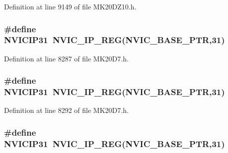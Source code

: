 Definition at line 9149 of file M\+K20\+D\+Z10.\+h.

\subsubsection[{\texorpdfstring{N\+V\+I\+C\+I\+P31}{NVICIP31}}]{\setlength{\rightskip}{0pt plus 5cm}\#define N\+V\+I\+C\+I\+P31~{\bf N\+V\+I\+C\+\_\+\+I\+P\+\_\+\+R\+EG}({\bf N\+V\+I\+C\+\_\+\+B\+A\+S\+E\+\_\+\+P\+TR},31)}\hypertarget{group___n_v_i_c___register___accessor___macros_ga967eba1d57cc2840334d1ee19cf97795}{}\label{group___n_v_i_c___register___accessor___macros_ga967eba1d57cc2840334d1ee19cf97795}


Definition at line 8287 of file M\+K20\+D7.\+h.

\subsubsection[{\texorpdfstring{N\+V\+I\+C\+I\+P31}{NVICIP31}}]{\setlength{\rightskip}{0pt plus 5cm}\#define N\+V\+I\+C\+I\+P31~{\bf N\+V\+I\+C\+\_\+\+I\+P\+\_\+\+R\+EG}({\bf N\+V\+I\+C\+\_\+\+B\+A\+S\+E\+\_\+\+P\+TR},31)}\hypertarget{group___n_v_i_c___register___accessor___macros_ga967eba1d57cc2840334d1ee19cf97795}{}\label{group___n_v_i_c___register___accessor___macros_ga967eba1d57cc2840334d1ee19cf97795}


Definition at line 8292 of file M\+K20\+D7.\+h.

\subsubsection[{\texorpdfstring{N\+V\+I\+C\+I\+P31}{NVICIP31}}]{\setlength{\rightskip}{0pt plus 5cm}\#define N\+V\+I\+C\+I\+P31~{\bf N\+V\+I\+C\+\_\+\+I\+P\+\_\+\+R\+EG}({\bf N\+V\+I\+C\+\_\+\+B\+A\+S\+E\+\_\+\+P\+TR},31)}\hypertarget{group___n_v_i_c___register___accessor___macros_ga967eba1d57cc2840334d1ee19cf97795}{}\label{group___n_v_i_c___register___accessor___macros_ga967eba1d57cc2840334d1ee19cf97795}


